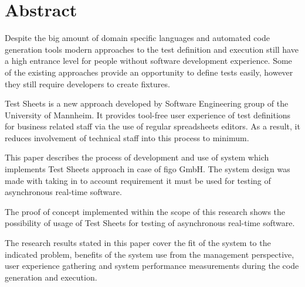 \chapter{Abstract}
\label{chap:abstract}
Despite the big amount of domain specific languages and automated code generation tools modern approaches to the test definition and execution still have a high entrance level for people without software development experience. Some of the existing approaches provide an opportunity to define tests easily, however they still require developers to create fixtures. 

Test Sheets is a new approach developed by Software Engineering group of the University of Mannheim. It provides  tool-free user experience of test definitions for business related staff via the use of regular spreadsheets editors.
As a result, it reduces involvement of technical staff into this process to minimum.

This paper describes the process of development and use of system which implements Test Sheets approach in case of figo GmbH. The system design was made with taking in to account requirement it must be used for testing of asynchronous real-time software.

The proof of concept implemented within the scope of this research shows the possibility of usage of Test Sheets for testing of asynchronous real-time software.

The research results stated in this paper cover the fit of the system to the indicated problem, benefits of the system use from the management perspective, user experience gathering and system performance measurements during the code generation and execution.
%
%
%
%
%
%
%

